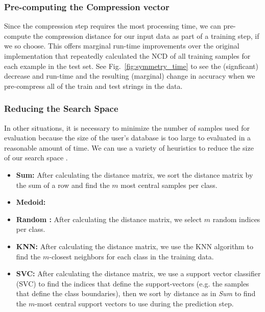 \documentclass[sigconf]{acmart}
\begin{document}
\subsubsection{Pre-computing the Compression vector}
Since the compression step requires the most processing time, we can pre-compute the compression distance for our input data as part of a training step, if we so choose. This offers marginal run-time improvements over the original implementation that repeatedly calculated the NCD of all training samples for each example in the test set. 
See Fig.~\ref{fig:symmetry_time} to see the (signficant) decrease and run-time  and the resulting (marginal) change in accuracy when we pre-compress all of the train and test strings in the data. %










\subsubsection{Reducing the Search Space}
\label{best-samples}
In other situations, it is necessary to minimize the number of samples used for evaluation because the size of the user's database is too large to evaluated in a reasonable amount of time. We can use a variety of heuristics to reduce the size of our search space \cite{amal2011survey}. 
\begin{itemize}
    \item \textbf{Sum:} After calculating the distance matrix, we sort the distance matrix by the sum of a row and find the $m$ most central samples per class.
    \item \textbf{Medoid: }
    \item \textbf{Random : } After calculating the distance matrix, we select $m$ random indices per class.
    \item \textbf{KNN: } After calculating the distance matrix, we use the KNN algorithm to find the $m$-closest neighbors for each class in the training data.
    \item \textbf{SVC: } After calculating the distance matrix, we use a support vector classifier (SVC) to find the indices that define the support-vectors (e.g. the samples that define the class boundaries), then we sort by distance as in \textit{Sum} to find the $m$-most central support vectors to use during the prediction step.
\end{itemize}
\end{document}
